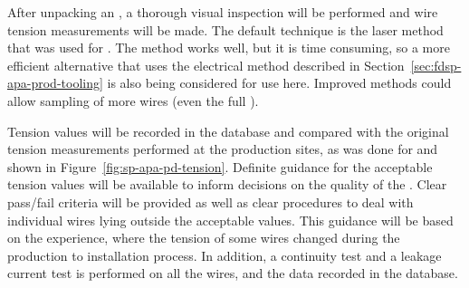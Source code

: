 \begin{comment}
\begin{dunetable}[QC List]{l|c|c}{tab:qclist}{List of tests performed for \dword{qc} upon receipt at the underground cleanroom} %
Test to perform   &  Number of wires/channels & Acceptable values, action\\ 
Visual inspection & All & > 99\% intact \\
Wire tension      & 10$\%$ sample & 5 $\pm$ \SI{1}{N}\\
Wire continuity   & All & $-$\\
Current leakage   & All & < X $\mu$A \\
Electronics connections & All & Perfect (> 99$\%$)\\
Cold test         & All & All intact (> 99$\%$)\\
\textbf{Overall}  & \textbf{All} & \textbf{At least 99$\%$ fully operational}\\
\end{dunetable}
\end{comment}

After unpacking an , a thorough visual inspection will be performed and wire tension measurements will be made. %
The default technique is the laser method that was used for .  The method works well, but it is time consuming, so %
a more efficient alternative that uses the electrical method described in Section~\ref{sec:fdsp-apa-prod-tooling} is also being considered for use here. Improved methods %
could allow sampling of more wires (even the full ). 

Tension values will be recorded in the database and compared with the original tension measurements performed at the production sites, as was done for  and shown in Figure~\ref{fig:sp-apa-pd-tension}. Definite guidance for the acceptable tension values will be available to inform decisions on the quality of the . Clear pass/fail criteria %
will be provided as well as clear procedures to deal with individual wires lying outside the acceptable values. %
This guidance will be based on the  experience, where the tension of some wires changed during the production to installation process. In addition, a continuity test and a leakage current test is performed on all the wires, and the data recorded in the database. 

